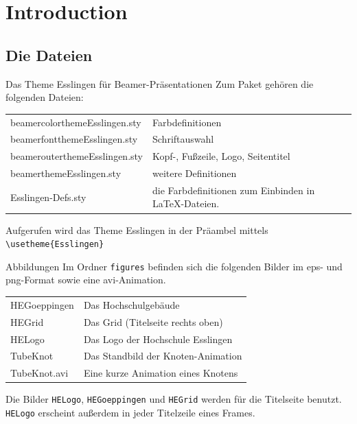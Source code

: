 \section{Introduction}

\subsection{Die Dateien}

\begin{frame}[fragile]{Das Theme Esslingen für Beamer-Präsentationen}
Zum Paket gehören die folgenden Dateien:


\begin{center}
  \begin{tabular}{lp{6cm}}
    beamercolorthemeEsslingen.sty & Farbdefinitionen \\
    beamerfontthemeEsslingen.sty & Schriftauswahl \\
    beamerouterthemeEsslingen.sty & Kopf-, Fußzeile, Logo, Seitentitel\\
    beamerthemeEsslingen.sty & weitere Definitionen \\
    Esslingen-Defs.sty & die Farbdefinitionen zum Einbinden in \LaTeX-Dateien.\\
  \end{tabular}
\end{center}
Aufgerufen wird das Theme Esslingen in der Präambel mittels
\verb+\usetheme{Esslingen}+

\end{frame}

\begin{frame}{Abbildungen} 
Im Ordner \texttt{figures} befinden sich die folgenden Bilder im eps- und
png-Format sowie eine avi-Animation.

\begin{center}
  \begin{tabular}{lp{6cm}}
  HEGoeppingen & Das Hochschulgebäude \\
  HEGrid & Das Grid (Titelseite rechts oben) \\
  HELogo & Das Logo der Hochschule Esslingen \\
  TubeKnot & Das Standbild der Knoten-Animation \\
  TubeKnot.avi & Eine kurze Animation eines Knotens \\
  \end{tabular}
\end{center}

Die Bilder \texttt{HELogo}, \texttt{HEGoeppingen} und \texttt{HEGrid} werden
für die Titelseite benutzt. \texttt{HELogo} erscheint außerdem in jeder
Titelzeile eines Frames.

\end{frame}

